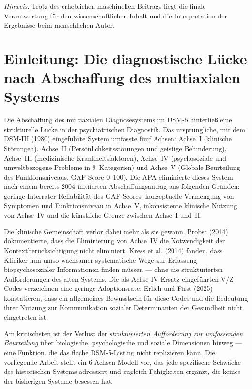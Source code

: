 \documentclass[11pt,a4paper]{article}
\begin{document}
\vspace{1em}
\noindent\textit{Hinweis:} Trotz des erheblichen maschinellen Beitrags liegt die finale Verantwortung f\"ur den wissenschaftlichen Inhalt und die Interpretation der Ergebnisse beim menschlichen Autor.

\newpage


\section{Einleitung: Die diagnostische L\"ucke nach Abschaffung des multiaxialen Systems}
\label{sec:einleitung}

Die Abschaffung des multiaxialen Diagnosesystems im DSM-5 \citep{APA2013} hinterlie\ss{} eine strukturelle L\"ucke in der psychiatrischen Diagnostik. Das urspr\"ungliche, mit dem DSM-III (1980) eingef\"uhrte System umfasste f\"unf Achsen: Achse~I (klinische St\"orungen), Achse~II (Pers\"onlichkeitsst\"orungen und geistige Behinderung), Achse~III (medizinische Krankheitsfaktoren), Achse~IV (psychosoziale und umweltbezogene Probleme in 9~Kategorien) und Achse~V (Globale Beurteilung des Funktionsniveaus, GAF-Score 0--100). Die APA eliminierte dieses System nach einem bereits 2004 initiierten Abschaffungsantrag aus folgenden Gr\"unden: geringe Interrater-Reliabilit\"at des GAF-Scores, konzeptuelle Vermengung von Symptomen und Funktionsniveau in Achse~V, inkonsistente klinische Nutzung von Achse~IV und die k\"unstliche Grenze zwischen Achse~I und~II.

Die klinische Gemeinschaft verlor dabei mehr als sie gewann. Probst (2014) dokumentierte, dass die Eliminierung von Achse~IV \glqq die Notwendigkeit der Kontextber\"ucksichtigung nicht eliminiert\grqq{}. Kress et al. (2014) fanden, dass Kliniker nun \glqq umso wachsamer systematische Wege zur Erfassung biopsychosozialer Informationen\grqq{} finden m\"ussen --- ohne die strukturierten Aufforderungen des alten Systems. Die als Achse-IV-Ersatz eingef\"uhrten V/Z-Codes verzeichnen eine geringe Adoptionsrate: Erlich und First (2025) konstatieren, dass \glqq ein allgemeines Bewusstsein f\"ur diese Codes und die Bedeutung ihrer Nutzung zur Kommunikation sozialer Determinanten der Gesundheit nicht eingetreten ist\grqq{}.

Am kritischsten ist der Verlust der \textit{strukturierten Aufforderung zur umfassenden Beurteilung} \"uber biologische, psychologische und soziale Dimensionen hinweg --- eine Funktion, die das flache DSM-5-Listing nicht replizieren kann. Die vorliegende Arbeit stellt ein 6-Achsen-Modell vor, das jede spezifische Schw\"ache des historischen Systems adressiert und zugleich F\"ahigkeiten erg\"anzt, die keines der bisherigen Systeme besessen hat.
\end{document}
